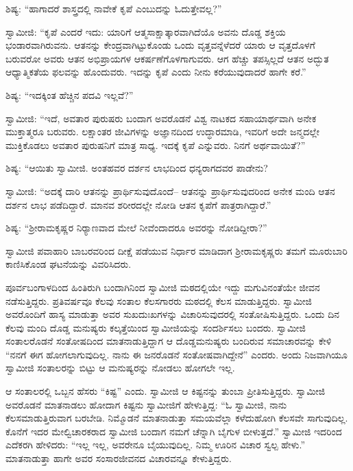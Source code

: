  ಶಿಷ್ಯ: “ಹಾಗಾದರೆ ಶಾಸ್ತ್ರದಲ್ಲಿ ನಾವೇಕೆ ಕೃಪೆ ಎಂಬುದನ್ನು ಓದುತ್ತೇವಲ್ಲ?” 

 ಸ್ವಾಮೀಜಿ: “ಕೃಪೆ ಎಂದರೆ ಇದು: ಯಾರಿಗೆ ಆತ್ಮಸಾಕ್ಷಾತ್ಕಾರವಾಗಿದೆಯೊ ಅವನು ದೊಡ್ಡ ಶಕ್ತಿಯ ಭಂಡಾರವಾಗಿರುವನು. ಆತನನ್ನು ಕೇಂದ್ರವಾಗಿಟ್ಟುಕೊಂಡು ಒಂದು ವೃತ್ತವನ್ನೆಳೆದರೆ ಯಾರು ಆ ವೃತ್ತದೊಳಗೆ ಬರುವರೋ ಅವರು ಆತನ ಅಭಿಪ್ರಾಯಗಳ ಆಕರ್ಷಣೆಗೊಳಗಾಗುವರು. ಆಗ ಹೆಚ್ಚು ತಪಸ್ಸಿಲ್ಲದೆ ಆತನ ಅದ್ಭುತ ಆಧ್ಯಾತ್ಮಿಕತೆಯ ಫಲವನ್ನು ಹೊಂದುವರು. ಇದನ್ನು ಕೃಪೆ ಎಂದು ನೀನು ಕರೆಯುವುದಾದರೆ ಹಾಗೇ ಕರೆ.” 

 ಶಿಷ್ಯ: “ಇದಕ್ಕಿಂತ ಹೆಚ್ಚಿನ ಪದವಿ ಇಲ್ಲವೆ?” 

 ಸ್ವಾಮೀಜಿ: “ಇದೆ, ಅವತಾರ ಪುರುಷರು ಬಂದಾಗ ಅವರೊಡನೆ ವಿಶ್ವ ನಾಟಕದ ಸಹಾಯಾರ್ಥವಾಗಿ ಅನೇಕ ಮುಕ್ತಾತ್ಮರೂ ಬರುವರು. ಲಕ್ಷಾಂತರ ಜೀವಿಗಳನ್ನು ಅಜ್ಞಾನದಿಂದ ಉದ್ಧಾರಮಾಡಿ, ಇವರಿಗೆ ಅದೇ ಜನ್ಮದಲ್ಲೇ ಮುಕ್ತಿಕೊಡಲು ಅವತಾರ ಪುರುಷನಿಗೆ ಮಾತ್ರ ಸಾಧ್ಯ. ಇದಕ್ಕೆ ಕೃಪೆ ಎನ್ನುವರು. ನಿನಗೆ ಅರ್ಥವಾಯಿತೆ?” 

 ಶಿಷ್ಯ: “ಆಯಿತು ಸ್ವಾಮೀಜಿ. ಅಂತಹವರ ದರ್ಶನ ಲಾಭದಿಂದ ಧನ್ಯರಾಗದವರ ಪಾಡೇನು? 

 ಸ್ವಾಮೀಜಿ: “ಅದಕ್ಕೆ ದಾರಿ ಆತನನ್ನು ಪ್ರಾರ್ಥಿಸುವುದೊಂದೆ– ಆತನನ್ನು ಪ್ರಾರ್ಥಿಸುವುದರಿಂದ ಅನೇಕ ಮಂದಿ ಆತನ ದರ್ಶನ ಲಾಭ ಪಡೆದಿದ್ದಾರೆ. ಮಾನವ ಶರೀರದಲ್ಲೇ ನೋಡಿ ಆತನ ಕೃಪೆಗೆ ಪಾತ್ರರಾಗಿದ್ದಾರೆ.” 

 ಶಿಷ್ಯ: “ಶ‍್ರೀರಾಮಕೃಷ್ಣರ ನಿರ‍್ಯಾಣವಾದ ಮೇಲೆ ನೀವೆಂದಾದರೂ ಅವರನ್ನು ನೋಡಿದ್ದೀರಾ?” 

 ಸ್ವಾಮೀಜಿ ಪವಾಹಾರಿ ಬಾಬರವರಿಂದ ದೀಕ್ಷೆ ಪಡೆಯುವ ನಿರ್ಧಾರ ಮಾಡಿದಾಗ ಶ‍್ರೀರಾಮಕೃಷ್ಣರು ತಮಗೆ ಮೂರುಬಾರಿ ಕಾಣಿಸಿಕೊಂಡ ಘಟನೆಯನ್ನು ವಿವರಿಸಿದರು. 

\delimiter

 ಪೂರ್ವಬಂಗಾಳದಿಂದ ಹಿಂತಿರುಗಿ ಬಂದಾಗಿನಿಂದ ಸ್ವಾಮೀಜಿ ಮಠದಲ್ಲಿಯೇ ಇದ್ದು ಮಗುವಿನಂತೆಯೇ ಜೀವನ ನಡೆಸುತ್ತಿದ್ದರು. ಪ್ರತಿವರ್ಷವೂ ಕೆಲವು ಸಂತಾಲ ಕೆಲಸಗಾರರು ಮಠದಲ್ಲಿ ಕೆಲಸ ಮಾಡುತ್ತಿದ್ದರು. ಸ್ವಾಮೀಜಿ ಅವರೊಂದಿಗೆ ಹಾಸ್ಯ ಮಾಡುತ್ತಾ ಅವರ ಸುಖದುಃಖಗಳನ್ನು ವಿಚಾರಿಸುವುದರಲ್ಲಿ ಸಂತೋಷಿಸುತ್ತಿದ್ದರು. ಒಂದು ದಿನ ಕೆಲವು ಮಂದಿ ದೊಡ್ಡ ಮನುಷ್ಯರು ಕಲ್ಕತ್ತೆಯಿಂದ ಸ್ವಾಮೀಜಿಯನ್ನು ಸಂದರ್ಶಿಸಲು ಬಂದರು. ಸ್ವಾಮೀಜಿ ಸಂತಾಲರೊಡನೆ ಸಂತೋಷದಿಂದ ಮಾತನಾಡುತ್ತಿದ್ದಾಗ ಆ ದೊಡ್ಡಮನುಷ್ಯರು ಬಂದಿರುವ ಸಮಾಚಾರವನ್ನು ಕೇಳಿ “ನನಗೆ ಈಗ ಹೋಗಲಾಗುವುದಿಲ್ಲ. ನಾನು ಈ ಜನರೊಡನೆ ಸಂತೋಷವಾಗಿದ್ದೇನೆ” ಎಂದರು. ಅಂದು ನಿಜವಾಗಿಯೂ ಸ್ವಾಮೀಜಿ ಸಂತಾಲರನ್ನು ಬಿಟ್ಟು ಆ ಮನುಷ್ಯರನ್ನು ನೋಡಲು ಹೋಗಲೇ ಇಲ್ಲ. 

 ಆ ಸಂತಾಲರಲ್ಲಿ ಒಬ್ಬನ ಹೆಸರು “ಕಿಷ್ಟ” ಎಂದು. ಸ್ವಾಮೀಜಿ ಆ ಕಿಷ್ಟನನ್ನು ತುಂಬಾ ಪ್ರೀತಿಸುತ್ತಿದ್ದರು. ಸ್ವಾಮೀಜಿ ಅವರೊಡನೆ ಮಾತನಾಡಲು ಹೋದಾಗ ಕಿಷ್ಟನು ಸ್ವಾಮೀಜಿಗೆ ಹೇಳುತ್ತಿದ್ದ: “ಓ ಸ್ವಾಮೀಜಿ, ನಾನು ಕೆಲಸಮಾಡುತ್ತಿರುವಾಗ ಬರಬೇಡಿ. ನಿಮ್ಮೊಡನೆ ಮಾತನಾಡುತ್ತಾ ಸಮಯವೆಲ್ಲಾ ಕಳೆದುಹೋಗಿ ಕೆಲಸವೇ ಸಾಗುವುದಿಲ್ಲ. ಕೊನೆಗೆ ಇದರ ಮೇಲ್ವಿಚಾರಕರಾದ ಸ್ವಾಮೀಜಿ ಬಂದಾಗ ನಮಗೆ ಚೆನ್ನಾಗಿ ಬೈಗುಳ ಬೀಳುತ್ತದೆ.” ಸ್ವಾಮೀಜಿ ಇದರಿಂದ ಎದೆಕರಗಿ ಹೇಳಿದರು: “ಇಲ್ಲ ಇಲ್ಲ, ಅವರೇನೂ ಬೈಯುವುದಿಲ್ಲ. ನಿಮ್ಮ ಊರಿನ ವಿಚಾರ ಸ್ವಲ್ಪ ಹೇಳು.” ಮಾತನಾಡುತ್ತಾ ಹಾಗೇ ಅವರ ಸಂಸಾರಜೀವನದ ವಿಚಾರವನ್ನೂ ಕೇಳುತ್ತಿದ್ದರು. 


